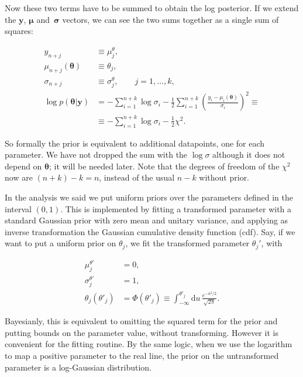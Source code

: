 Now these two terms have to be summed to obtain the log posterior. If we extend
the $\mathbf y$, $\boldsymbol\mu$ and~$\boldsymbol\sigma$ vectors, we can see
the two sums together as a single sum of squares:

\begin{align}
    y_{n+j} &\equiv \mu^\theta_j, \\
    \mu_{n+j}(\boldsymbol\theta) &\equiv \theta_j, \\
    \sigma_{n+j} &\equiv \sigma^\theta_j, \qquad j = 1, \ldots, k, \\
    \log p(\boldsymbol\theta|\mathbf y) &=
    -\sum_{i=1}^{n+k} \log\sigma_i
    - \frac 12 \sum_{i=1}^{n+k}
    \left( \frac {y_i - \mu_i(\boldsymbol\theta)} {\sigma_i} \right)^2 \equiv \\
    &\equiv -\sum_{i=1}^{n+k} \log\sigma_i - \frac12 \chi^2. \label{eq:chi2}
\end{align}

So formally the prior is equivalent to additional datapoints, one for each
parameter. We have not dropped the sum with the $\log\sigma$ although it does
not depend on $\boldsymbol\theta$; it will be needed later. Note that the
degrees of freedom of the $\chi^2$ now are $(n+k)-k = n$, instead of the usual
$n-k$ without prior.

In the analysis we said we put uniform priors over the parameters defined in
the interval $(0,1)$. This is implemented by fitting a transformed parameter
with a standard Gaussian prior with zero mean and unitary variance, and
applying as inverse transformation the Gaussian cumulative density function
(cdf). Say, if we want to put a uniform prior on $\theta_j$, we fit the
transformed parameter $\theta_j'$, with

\begin{align}
    \mu^{\theta'}_j &= 0, \\
    \sigma^{\theta'}_j &= 1, \\
    \theta_j(\theta'_j) &= \Phi(\theta'_j)
    \equiv \int_{-\infty}^{\theta'_j} \mathrm du\,
    \frac {e^{-u^2/2}} {\sqrt{2\pi}}.
\end{align}

Bayesianly, this is equivalent to omitting the squared term for the prior and
putting bounds on the parameter value, without transforming. However it is
convenient for the fitting routine. By the same logic, when we use the
logarithm to map a positive parameter to the real line, the prior on the
untransformed parameter is a log-Gaussian distribution.

